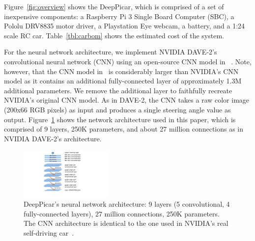 Figure~\ref{fig:overview} shows the DeepPicar, which is comprised of a
set of inexpensive components: a Raspberry Pi 3 Single Board Computer
(SBC), a Pololu DRV8835 motor driver, a Playstation Eye webcam, a
battery, and a 1:24 scale RC car. Table~\ref{tbl:carbom} shows the
estimated cost of the system.

For the neural network architecture, we implement NVIDIA DAVE-2's
convolutional neural network (CNN) using an open-source CNN model in
~\cite{deeptesla}. Note, however, that the CNN model
in~\cite{deeptesla} is considerably larger than NVIDIA's CNN
model as it contains an additional fully-connected layer of
approximately 1.3M additional parameters. We remove the additional
layer to faithfully recreate NVIDIA's original CNN model.
As in DAVE-2, the CNN takes a raw color image (200x66 RGB pixels)
as input and produces a single steering angle value as output.
Figure~\ref{fig:architecture} shows the network architecture
used in this paper, which is comprised of 9 layers, 250K parameters,
and about 27 million connections as in NVIDIA DAVE-2's architecture.

\begin{figure}[h]
  \centering
  \includegraphics[width=0.4\textwidth]{figs/architecture}
  \caption{DeepPicar's neural network architecture: 9 layers (5
    convolutional, 4 fully-connected layers), 27 million connections,
    250K parameters. The CNN architecture is identical to the one 
	used in NVIDIA's real self-driving car~\cite{Bojarski2016}.}
  \label{fig:architecture}
\end{figure}



